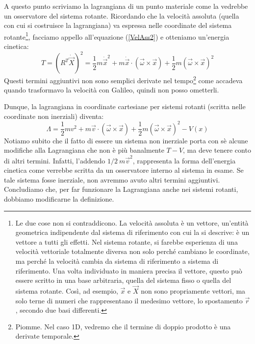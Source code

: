 \documentclass[a4paper,openany]{article}
\begin{document}
	A questo punto scriviamo la lagrangiana di un punto materiale come la vedrebbe un osservatore del sistema rotante. Ricordando che la velocità assoluta (quella con cui si costruisce la lagrangiana) va espressa nelle coordinate del sistema rotante\footnote{Le due cose non si contraddicono. La velocità assoluta è un vettore, un'entità geometrica indipendente dal sistema di riferimento con cui la si descrive: è un vettore a tutti gli effetti. Nel sistema rotante, si farebbe esperienza di una velocità vettoriale totalmente diversa non solo perché cambiano le coordinate, ma perché la velocità cambia da sistema di riferimento a sistema di riferimento. Una volta individuato in maniera precisa il vettore, questo può essere scritto in una base arbitraria, quella del sistema fisso o quella del sistema rotante. Così, ad esempio, $\vec{x}$ e $\vec{X}$ non sono propriamente vettori, ma solo terne di numeri che rappresentano il medesimo vettore, lo spostamento $\vec{r}$, secondo due basi differenti.}, facciamo appello all'equazione (\ref{VelAss2}) e otteniamo un'energia cinetica:
	\begin{equation}
		T = (R^{T}\dot{\vec{X}})^2 = \dfrac{1}{2}m\dot{\vec{x}}^{2} + m\dot{\vec{x}}\cdot(\vec{\omega}\times\vec{x})+ \dfrac{1}{2}m (\vec{\omega}\times\vec{x})^{2}
	\end{equation}
	Questi termini aggiuntivi non sono semplici derivate nel tempo\footnote{Piomme. Nel caso 1D, vedremo che il termine di doppio prodotto è una derivate temporale.} come accadeva quando trasformavo la velocità con Galileo, quindi non posso ometterli.
	
	Dunque, la lagrangiana in coordinate cartesiane per sistemi rotanti (scritta nelle coordinate non inerziali) diventa:
	\begin{equation}
		\Lambda = \dfrac{1}{2}mv^{2} + m\vec{v}\cdot(\vec{\omega}\times\vec{x}) + \dfrac{1}{2}m(\vec{\omega}\times\vec{x})^{2} - V(x)
		\label{LagRot}
	\end{equation}
	Notiamo subito che il fatto di essere un sistema non inerziale porta con sè alcune modifiche alla Lagrangiana che non è più banalmente $T-V$, ma deve tenere conto di altri termini. Infatti, l'addendo $1/2\> m\vec{v}^{2}$, rappresenta la forma dell'energia cinetica come verrebbe scritta da un osservatore interno al sistema in esame. Se tale sistema fosse inerziale, non avremmo avuto altri termini aggiuntivi. Concludiamo che, per far funzionare la Lagrangiana anche nei sistemi rotanti, dobbiamo modificarne la definizione.
\end{document}

